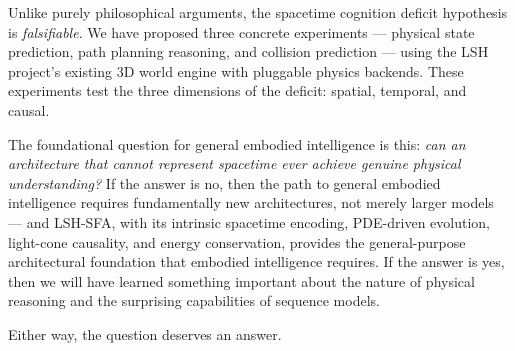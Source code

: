 \documentclass{article}
\begin{document}
Unlike purely philosophical arguments, the spacetime cognition deficit hypothesis is \textit{falsifiable}. We have proposed three concrete experiments --- physical state prediction, path planning reasoning, and collision prediction --- using the LSH project's existing 3D world engine with pluggable physics backends. These experiments test the three dimensions of the deficit: spatial, temporal, and causal.

The foundational question for general embodied intelligence is this: \textit{can an architecture that cannot represent spacetime ever achieve genuine physical understanding?} If the answer is no, then the path to general embodied intelligence requires fundamentally new architectures, not merely larger models --- and LSH-SFA, with its intrinsic spacetime encoding, PDE-driven evolution, light-cone causality, and energy conservation, provides the general-purpose architectural foundation that embodied intelligence requires. If the answer is yes, then we will have learned something important about the nature of physical reasoning and the surprising capabilities of sequence models.

Either way, the question deserves an answer.


\end{document}
